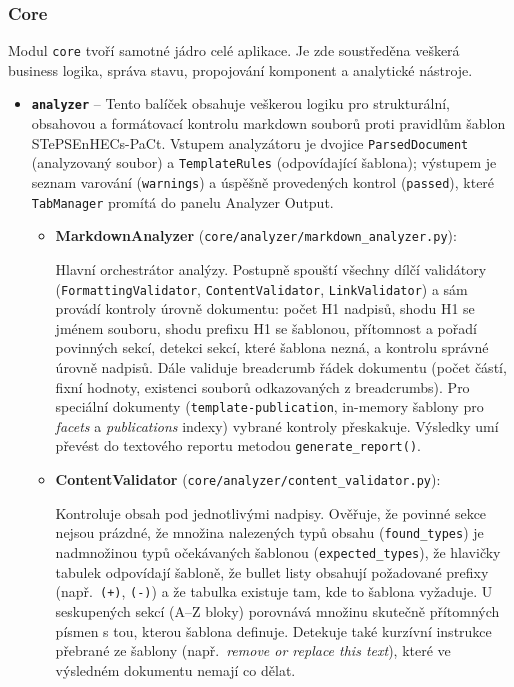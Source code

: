 \documentclass[12pt, a4paper]{article}
\begin{document}
\subsubsection{Core}

Modul \texttt{core} tvoří samotné jádro celé aplikace. Je zde soustředěna veškerá business logika, správa stavu, 
propojování komponent a analytické nástroje.

\begin{itemize}

    \item \textbf{\texttt{analyzer}} -- Tento balíček obsahuje veškerou logiku pro strukturální, obsahovou
    a formátovací kontrolu markdown souborů proti pravidlům šablon STePSEnHECs-PaCt. Vstupem analyzátoru
    je dvojice \texttt{ParsedDocument} (analyzovaný soubor) a \texttt{TemplateRules} (odpovídající šablona);
    výstupem je seznam varování (\texttt{warnings}) a úspěšně provedených kontrol (\texttt{passed}), které
    \texttt{TabManager} promítá do panelu Analyzer Output.

    \begin{itemize}
        \item \textbf{MarkdownAnalyzer} (\texttt{core/analyzer/markdown\_analyzer.py}):

        Hlavní orchestrátor analýzy. Postupně spouští všechny dílčí validátory
        (\texttt{FormattingValidator}, \texttt{ContentValidator}, \texttt{LinkValidator}) a sám provádí
        kontroly úrovně dokumentu: počet H1 nadpisů, shodu H1 se jménem souboru, shodu prefixu H1
        se šablonou, přítomnost a pořadí povinných sekcí, detekci sekcí, které šablona nezná, a kontrolu
        správné úrovně nadpisů. Dále validuje breadcrumb řádek dokumentu (počet částí, fixní hodnoty,
        existenci souborů odkazovaných z breadcrumbs). Pro speciální dokumenty
        (\texttt{template-publication}, in-memory šablony pro \emph{facets} a \emph{publications} indexy)
        vybrané kontroly přeskakuje. Výsledky umí převést do textového reportu
        metodou \texttt{generate\_report()}.

        \item \textbf{ContentValidator} (\texttt{core/analyzer/content\_validator.py}):

        Kontroluje obsah pod jednotlivými nadpisy. Ověřuje, že povinné sekce nejsou prázdné, že množina
        nalezených typů obsahu (\texttt{found\_types}) je nadmnožinou typů očekávaných šablonou
        (\texttt{expected\_types}), že hlavičky tabulek odpovídají šabloně, že bullet listy obsahují
        požadované prefixy (např.\ \texttt{(+)}, \texttt{(-)}) a že tabulka existuje tam, kde to šablona
        vyžaduje. U seskupených sekcí (A--Z bloky) porovnává množinu skutečně přítomných písmen s tou,
        kterou šablona definuje. Detekuje také kurzívní instrukce přebrané ze šablony
        (např.\ \emph{remove or replace this text}), které ve výsledném dokumentu nemají co dělat.


\end{itemize}
\end{itemize}
\end{document}
